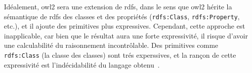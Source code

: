 Idéalement, \acrshort{owl2} sera une extension de \acrshort{rdfs},
dans le sens que \acrshort{owl2} hérite la sémantique de
\acrshort{rdfs} des classes et des propriétés (\texttt{rdfs:Class},
\texttt{rdfs:Property}, etc.), et il ajoute des primitives plus
expressives. Cependant, cette approche est inapplicable, car bien que
le résultat aura une forte expressivité, il risque d'avoir une
calculabilité du raisonnement incontrôlable. Des primitives comme
\texttt{rdfs:Class} (la classe des classes) sont trés experssives, et
la rançon de cette expressivité est l'indécidabilité du langage
obtenu~\cite{antoniou2012semantic}.\medskip
\newpage
